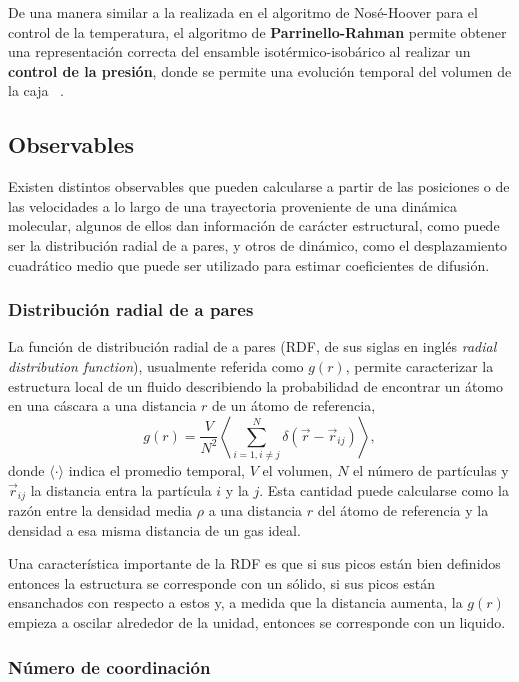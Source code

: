 De una manera similar a la realizada en el algoritmo de Nosé-Hoover para el 
control de la temperatura, el algoritmo de \textbf{Parrinello-Rahman} permite
obtener una representación correcta del ensamble isotérmico-isobárico al 
realizar un \textbf{control de la presión}, donde se permite una evolución 
temporal del volumen de la caja ~\cite{parrinello-rahman}.


\subsection{Observables}

Existen distintos observables que pueden calcularse a partir de las posiciones o
de las velocidades a lo largo de una trayectoria proveniente de una dinámica 
molecular, algunos de ellos dan información de carácter estructural, como puede 
ser la distribución radial de a pares, y otros de dinámico, como el 
desplazamiento cuadrático medio que puede ser utilizado para estimar 
coeficientes de difusión.

\subsubsection{Distribución radial de a pares}

La función de distribución radial de a pares (RDF, de sus siglas en inglés
\textit{radial distribution function}), usualmente referida como $g(r)$, permite 
caracterizar la estructura local de un fluido describiendo la probabilidad de 
encontrar un átomo en una cáscara a una distancia $r$ de un átomo de referencia,
$$
g(r) = \frac{V}{N^2} \left\langle \sum_{i=1, i\neq j}^N \delta(\vec{r} - \vec{r}_{ij}) \right\rangle,
$$
donde $\langle \cdot \rangle$ indica el promedio temporal, $V$ el volumen, $N$ el
número de partículas y $\vec{r}_{ij}$ la distancia entra la partícula $i$ y la $j$.
Esta cantidad puede calcularse como la razón entre la densidad media $\rho$ a
una distancia $r$ del átomo de referencia y la densidad a esa misma distancia de 
un gas ideal.

Una característica importante de la RDF es que si sus picos están bien definidos
entonces la estructura se corresponde con un sólido, si sus picos están ensanchados
con respecto a estos y, a medida que la distancia aumenta, la $g(r)$ empieza a 
oscilar alrededor de la unidad, entonces se corresponde con un liquido.

\subsubsection{Número de coordinación}

